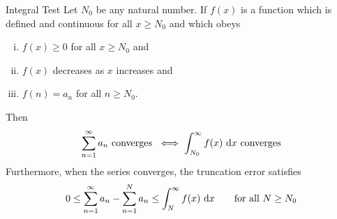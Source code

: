 \begin{frame}[t]
\begin{block}{Integral Test}
Let $N_0$ be any natural number. If $f(x)$ is a function which is defined
and continuous for all $x\ge N_0$ and which obeys
\begin{enumerate}[(i)]
\item $f(x)\ge 0$ for all $x\ge N_0$ and
\item $f(x)$ decreases as $x$ increases and
\item $f(n)=a_n$ for all  $n\ge N_0$.
\end{enumerate}

Then
\hfill{}\begin{equation*}
\sum_{n=1}^\infty a_n\text{ converges }\iff
\int_{N_0}^\infty f(x)\ \text{d}{x}\text{ converges}
\end{equation*}\pause
Furthermore, when the series converges, the truncation error satisfies
\begin{equation*}
0 \le \sum_{n=1}^\infty a_n-\sum_{n=1}^N a_n\le
  \int_N^\infty f(x)\ \text{d}{x}\qquad\text{for all $N\ge N_0$}
\end{equation*}

\end{block}
\end{frame}

